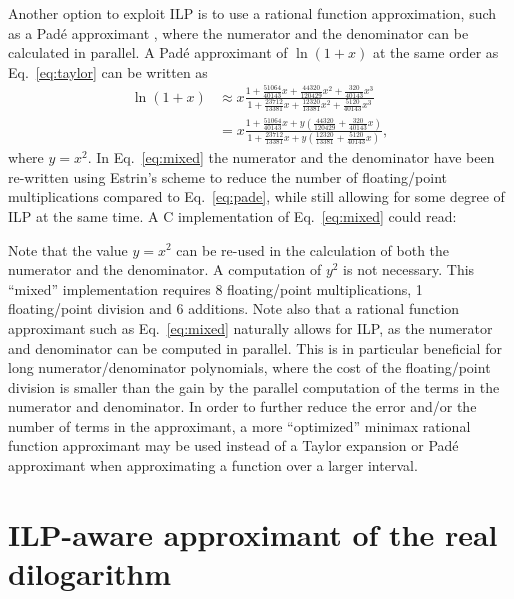 \documentclass[10pt,DIV=16,twocolumn,numbers=noenddot]{scrartcl}
\begin{document}
Another option to exploit ILP is to use a rational function
approximation, such as a Padé approximant \cite{pade}, where the
numerator and the denominator can be calculated in parallel.  A Padé
approximant of $\ln(1+x)$ at the same order as Eq.~\eqref{eq:taylor}
can be written as
%
\begin{align}
  \ln(1+x) &\approx x
  \frac{
    1 + \frac{51064}{40143} x + \frac{44320}{120429} x^2 + \frac{320}{40143} x^3
  }{
    1 + \frac{23712}{13381} x + \frac{12320}{13381} x^2 + \frac{5120}{40143} x^3
  }
  \label{eq:pade}
  \\
  &= x
  \frac{
    1 + \frac{51064}{40143} x + y \left(\frac{44320}{120429} + \frac{320}{40143} x\right)
  }{
    1 + \frac{23712}{13381} x + y \left(\frac{12320}{13381} + \frac{5120}{40143} x\right)
  },
  \label{eq:mixed}
\end{align}
%
where $y=x^2$.  In Eq.~\eqref{eq:mixed} the numerator and the
denominator have been re-written using Estrin's scheme to reduce the
number of floating\-/point multiplications compared to
Eq.~\eqref{eq:pade}, while still allowing for some degree of ILP at
the same time.  A C implementation of Eq.~\eqref{eq:mixed} could read:
%

%
Note that the value $y=x^2$ can be re-used in the calculation of both
the numerator and the denominator.  A computation of $y^2$ is not
necessary.  This ``mixed'' implementation requires 8 floating\-/point
multiplications, 1 floating\-/point division and 6 additions.  Note
also that a rational function approximant such as Eq.~\eqref{eq:mixed}
naturally allows for ILP, as the numerator and denominator can be
computed in parallel.  This is in particular beneficial for long
numerator/denominator polynomials, where the cost of the
floating\-/point division is smaller than the gain by the parallel
computation of the terms in the numerator and denominator.  In order
to further reduce the error and/or the number of terms in the
approximant, a more ``optimized'' minimax rational function
approximant may be used instead of a Taylor expansion or Padé
approximant when approximating a function over a larger interval.


\section{ILP-aware approximant of the real dilogarithm}
\label{sec:algorithm}
\end{document}
